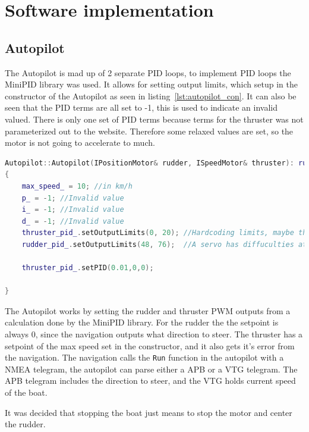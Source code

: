 \section{Software implementation}

\subsection{Autopilot}
The Autopilot is mad up of 2 separate PID loops, to implement PID loops the MiniPID library was used\cite{minipid}. It allows for setting output limits, which setup in the constructor of the Autopilot as seen in listing~\ref{lst:autopilot_con}. It can also be seen that the PID terms are all set to -1, this is used to indicate an invalid valued. There is only one set of PID terms because terms for the thruster was not parameterized out to the website. Therefore some relaxed values are set, so the motor is not going to accelerate to much. 

\begin{lstlisting}[caption = {Constructor method of the Autopilot}, captionpos=b, label={lst:autopilot_con}, language=C++,firstnumber=1]
Autopilot::Autopilot(IPositionMotor& rudder, ISpeedMotor& thruster): rudder_pid_(0, 0, 0), thruster_pid_(1,0,0), rudder_(rudder), thruster_(thruster)
{
	max_speed_ = 10; //in km/h
	p_ = -1; //Invalid value
	i_ = -1; //Invalid value
	d_ = -1; //Invalid value
	thruster_pid_.setOutputLimits(0, 20); //Hardcoding limits, maybe this should be done through the user interface
	rudder_pid_.setOutputLimits(48, 76);  //A servo has diffuculties at the edges ei. 0 and 90 so it is limited

	thruster_pid_.setPID(0.01,0,0);

}
\end{lstlisting}

The Autopilot works by setting the rudder and thruster PWM outputs from a calculation done by the MiniPID library. For the rudder the the setpoint is always 0, since the navigation outputs what direction to steer. The thruster has a setpoint of the max speed set in the constructor, and it also gets it's error from the navigation. The navigation calls the \texttt{Run} function in the autopilot with a NMEA telegram, the autopilot can parse either a APB or a VTG telegram. The APB telegram includes the direction to steer, and the VTG holds current speed of the boat. 

It was decided that stopping the boat just means to stop the motor and center the rudder. 

